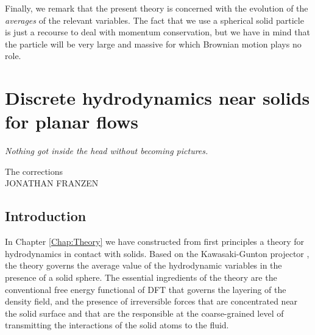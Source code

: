 \documentclass[b5paper,openright,10pt]{book}
\begin{document}
Finally, we remark that the present theory is concerned with the evolution of the \textit{averages} of the relevant variables. 
The fact that we use a spherical solid particle is just a recourse to deal with momentum conservation, but we have in mind that the particle will be very large and massive for which Brownian motion plays no role. 


\chapter{Discrete hydrodynamics near solids for planar flows}\label{Chap:Planar}
\epigraph{\textit{Nothing got inside the head without becoming pictures.}}{The corrections \\ JONATHAN FRANZEN}
\section{Introduction}
In Chapter \ref{Chap:Theory} we  have constructed  from  first
principles a theory  for hydrodynamics in contact with  solids.    Based   on    the   Kawasaki-Gunton   projector
\cite{Kawasaki1973,Grabert1982}, the theory  governs the average value
of the hydrodynamic variables in the  presence of a solid sphere.  The
essential ingredients of  the theory are the  conventional free energy
functional of DFT that governs the  layering of the density field, and
the presence  of irreversible  forces that  are concentrated  near the
solid surface and that are the responsible at the coarse-grained level
of transmitting the  interactions of the solid atoms to  the fluid. 
\end{document}
